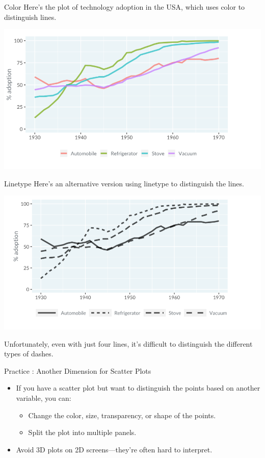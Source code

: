 \documentclass[
  ignorenonframetext,
]{beamer}
\providecommand{\tightlist}{%
  \setlength{\itemsep}{0pt}\setlength{\parskip}{0pt}}
\begin{document}
\begin{frame}{Color}
\label{color-3}
Here's the plot of technology adoption in the USA, which uses color to
distinguish lines.

\includegraphics{../images/im72.png}
\end{frame}

\begin{frame}{Linetype}
\label{linetype}
Here's an alternative version using linetype to distinguish the lines.

\includegraphics{../images/im73.png}

Unfortunately, even with just four lines, it's difficult to distinguish
the different types of dashes.
\end{frame}

\begin{frame}{Practice : Another Dimension for Scatter Plots}
\label{practice-another-dimension-for-scatter-plots}
\begin{itemize}
\tightlist
\item
  If you have a scatter plot but want to distinguish the points based on
  another variable, you can:

  \begin{itemize}
  \tightlist
  \item
    Change the color, size, transparency, or shape of the points.
  \item
    Split the plot into multiple panels.
  \end{itemize}
\item
  Avoid 3D plots on 2D screens---they're often hard to interpret.
\end{itemize}
\end{frame}
\end{document}
